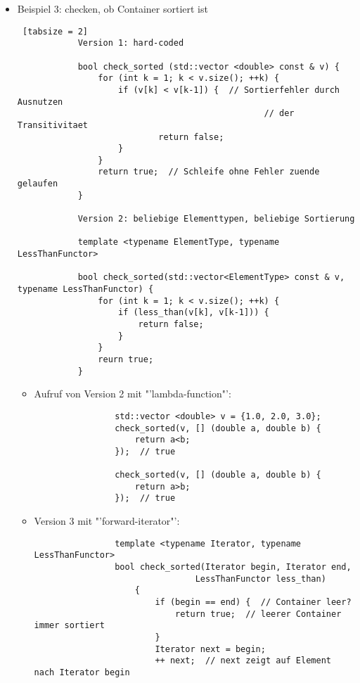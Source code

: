 \documentclass{article}
\begin{document}
\begin{itemize}
\begin{lstlisting} [tabsize = 2]
			template <typename Iterator>
			
			void print_container(Iterator begin, Iterator end) {
				std::cout << "{";
				if (begin != end) {  // teste, ob Container leer
					std::cout << " " << *begin;
					++begin;
					for (; begin != end; ++begin) {
						std::cout << ", " << *begin;
					}
				}
				std::cout << "}";
			}
		\end{lstlisting}
		\item Beispiel 3: checken, ob Container sortiert ist
		\begin{lstlisting} [tabsize = 2]
			Version 1: hard-coded
			
			bool check_sorted (std::vector <double> const & v) {
				for (int k = 1; k < v.size(); ++k) {
					if (v[k] < v[k-1]) {  // Sortierfehler durch Ausnutzen 
												 // der Transitivitaet
							return false;
					}
				}
				return true;  // Schleife ohne Fehler zuende gelaufen
			}
			
			Version 2: beliebige Elementtypen, beliebige Sortierung
			
			template <typename ElementType, typename LessThanFunctor>
			
			bool check_sorted(std::vector<ElementType> const & v, typename LessThanFunctor) {
				for (int k = 1; k < v.size(); ++k) {
					if (less_than(v[k], v[k-1])) {
						return false;
					}
				}
				reurn true;
			}
		\end{lstlisting}
		\begin{itemize}
			\item Aufruf von Version 2 mit "'lambda-function"':
			\begin{lstlisting}
				std::vector <double> v = {1.0, 2.0, 3.0};
				check_sorted(v, [] (double a, double b) {
					return a<b;
				});  // true
				
				check_sorted(v, [] (double a, double b) {
					return a>b;
				});  // true
			\end{lstlisting}
			\item Version 3 mit "'forward-iterator"':
			\begin{lstlisting}
				template <typename Iterator, typename LessThanFunctor>
				bool check_sorted(Iterator begin, Iterator end, 
								LessThanFunctor less_than)
					{
						if (begin == end) {  // Container leer?
							return true;  // leerer Container immer sortiert
						}
						Iterator next = begin;  
						++ next;  // next zeigt auf Element nach Iterator begin
						

\end{lstlisting}
\end{itemize}
\end{itemize}
\end{document}
